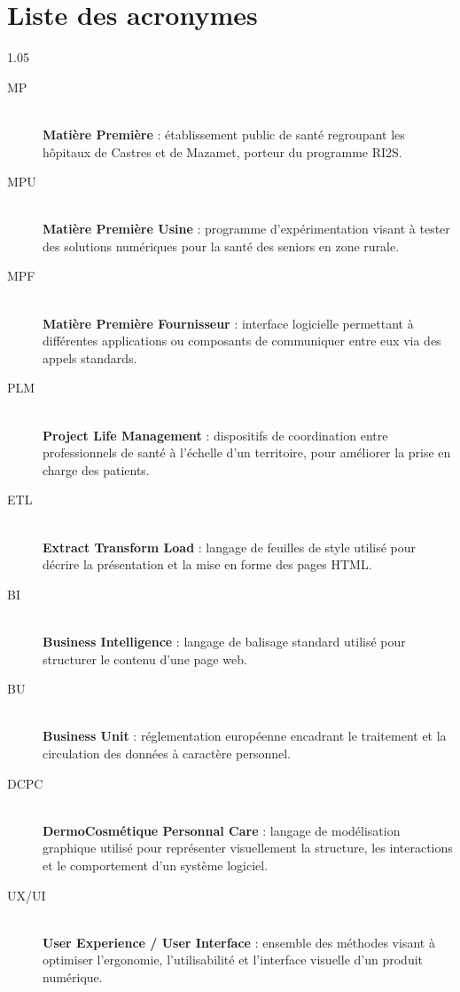 \chapter*{Liste des acronymes}
  
\begin{spacing}{1.05}

\begin{description}
  \item[MP] \hfill \\
  \textbf{Matière Première} : établissement public de santé regroupant les hôpitaux de Castres et de Mazamet, porteur du programme RI2S.

  \item[MPU] \hfill \\
  \textbf{Matière Première Usine} : programme d’expérimentation visant à tester des solutions numériques pour la santé des seniors en zone rurale.

  \item[MPF] \hfill \\
  \textbf{Matière Première Fournisseur} : interface logicielle permettant à différentes applications ou composants de communiquer entre eux via des appels standards.

  \item[PLM] \hfill \\
  \textbf{Project Life Management} : dispositifs de coordination entre professionnels de santé à l’échelle d’un territoire, pour améliorer la prise en charge des patients.

  \item[ETL] \hfill \\
  \textbf{Extract Transform Load} : langage de feuilles de style utilisé pour décrire la présentation et la mise en forme des pages HTML.

  \item[BI] \hfill \\
  \textbf{Business Intelligence} : langage de balisage standard utilisé pour structurer le contenu d’une page web.

  \item[BU] \hfill \\
  \textbf{Business Unit} : réglementation européenne encadrant le traitement et la circulation des données à caractère personnel.

  \item[DCPC] \hfill \\
  \textbf{DermoCosmétique Personnal Care} : langage de modélisation graphique utilisé pour représenter visuellement la structure, les interactions et le comportement d’un système logiciel.

  \item[UX/UI] \hfill \\
  \textbf{User Experience / User Interface} : ensemble des méthodes visant à optimiser l’ergonomie, l’utilisabilité et l’interface visuelle d’un produit numérique.
\end{description}
\end{spacing}